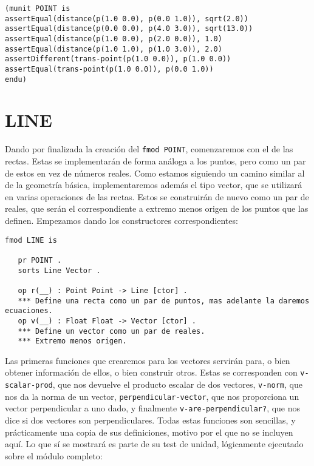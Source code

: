 {\codesize
\begin{verbatim}
(munit POINT is
assertEqual(distance(p(1.0 0.0), p(0.0 1.0)), sqrt(2.0))
assertEqual(distance(p(0.0 0.0), p(4.0 3.0)), sqrt(13.0))
assertEqual(distance(p(1.0 0.0), p(2.0 0.0)), 1.0)
assertEqual(distance(p(1.0 1.0), p(1.0 3.0)), 2.0)
assertDifferent(trans-point(p(1.0 0.0)), p(1.0 0.0))
assertEqual(trans-point(p(1.0 0.0)), p(0.0 1.0))
endu)
\end{verbatim}
}

\section{LINE}

Dando por finalizada la creación del \texttt{fmod POINT}, comenzaremos con el de las rectas. Estas se implementarán de forma análoga a los puntos, pero como un par de estos en vez de números reales. Como estamos siguiendo un camino similar al de la geometría básica, implementaremos además el tipo vector, que se utilizará en varias operaciones de las rectas. Estos se construirán de nuevo como un par de reales, que serán el correspondiente a extremo menos origen de los puntos que las definen. Empezamos dando los constructores correspondientes:

{\codesize
\begin{verbatim}
fmod LINE is 

   pr POINT .
   sorts Line Vector .

   op r(__) : Point Point -> Line [ctor] .
   *** Define una recta como un par de puntos, mas adelante la daremos ecuaciones.
   op v(__) : Float Float -> Vector [ctor] .
   *** Define un vector como un par de reales.
   *** Extremo menos origen.
\end{verbatim}
}

Las primeras funciones que crearemos para los vectores servirán para, o bien obtener información de ellos, o bien construir otros. Estas se corresponden con \texttt{v-scalar-prod}, que nos devuelve el producto escalar de dos vectores, \texttt{v-norm}, que nos da la norma de un vector, \texttt{perpendicular-vector}, que nos proporciona un vector perpendicular a uno dado, y finalmente \texttt{v-are-perpendicular?}, que nos dice si dos vectores son perpendiculares. Todas estas funciones son sencillas, y prácticamente una copia de sus definiciones, motivo por el que no se incluyen aquí. Lo que sí se mostrará es parte de su test de unidad, lógicamente ejecutado sobre el módulo completo:\par

